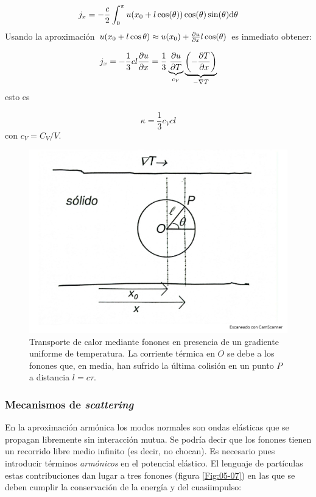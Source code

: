 \begin{equation}
    j_x = - \frac{c}{2} \int_0^\pi u (x_0 + l \cos (\theta)) \cos (\theta) \sin (\theta) \mathrm{d} \theta
\end{equation}
Usando la aproximación $u(x_0+l\cos \theta) \approx u(x_0) + \frac{\partial u}{\partial x} l \cos(\theta)$ es inmediato obtener:

\begin{equation}
j_x = - \frac{1}{3} cl \frac{\partial u}{\partial x} = \frac{1}{3} \underbrace{\frac{\partial u}{\partial T}}_{c_V} \underbrace{\left( -\frac{\partial T}{\partial x} \right)}_{-\nabla T}
\end{equation}
esto es

\begin{equation}
    \kappa = \frac{1}{3} c_V cl
\end{equation}
con $c_V=C_V/V$.

\begin{figure}[h!] \centering
    \includegraphics[scale=0.25]{Cuerpo/Ch_05/Fotos libro 6.pdf}
    \caption{Transporte de calor mediante fonones en presencia de un gradiente uniforme de temperatura. La corriente térmica en $O$ se debe a los fonones que, en media, han sufrido la última colisión en un punto $P$ a distancia $l=c\tau$.}
    \label{Fig:05-06}
\end{figure}    
 
\subsubsection{Mecanismos de \textit{scattering}}

En la aproximación armónica los modos normales son ondas elásticas que se propagan libremente sin interacción mutua. Se podría decir que los fonones tienen un recorrido libre medio infinito (es decir, no chocan). Es necesario pues introducir términos \textit{armónicos} en el potencial elástico. El lenguaje de partículas estas contribuciones dan lugar a tres fonones (figura \ref{Fig:05-07}) en las que se deben cumplir la conservación de la energía y del cuasiimpulso:

